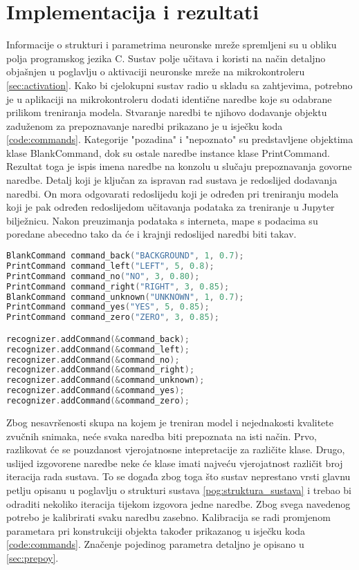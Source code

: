 \chapter{Implementacija i rezultati}
\label{pog:implement}

Informacije o strukturi i parametrima neuronske mreže spremljeni su u obliku polja
programskog jezika C. Sustav polje učitava i koristi na način detaljno objašnjen 
u poglavlju o aktivaciji neuronske mreže na mikrokontroleru \ref{sec:activation}.
Kako bi cjelokupni sustav radio u skladu sa zahtjevima, potrebno je u aplikaciji
na mikrokontroleru dodati identične naredbe koje su odabrane prilikom treniranja
modela. Stvaranje naredbi te njihovo dodavanje objektu zaduženom za prepoznavanje
naredbi prikazano je u isječku koda \ref{code:commands}. Kategorije "pozadina" i
"nepoznato" su predstavljene objektima klase BlankCommand, dok su ostale naredbe 
instance klase PrintCommand. Rezultat toga je ispis imena naredbe na konzolu u slučaju
prepoznavanja govorne naredbe. Detalj koji je ključan za ispravan rad sustava je redoslijed
dodavanja naredbi. On mora odgovarati redoslijedu koji je određen pri treniranju modela koji
je pak određen redoslijedom učitavanja podataka za treniranje u Jupyter bilježnicu. Nakon
preuzimanja podataka s interneta, mape s podacima su poredane abecedno tako da 
će i krajnji redoslijed naredbi biti takav.

\begin{lstlisting}[language=C++, caption=Stvaranje naredbi, label=code:commands]
BlankCommand command_back("BACKGROUND", 1, 0.7);
PrintCommand command_left("LEFT", 5, 0.8);
PrintCommand command_no("NO", 3, 0.80);
PrintCommand command_right("RIGHT", 3, 0.85);
BlankCommand command_unknown("UNKNOWN", 1, 0.7);
PrintCommand command_yes("YES", 5, 0.85);
PrintCommand command_zero("ZERO", 3, 0.85);

recognizer.addCommand(&command_back);
recognizer.addCommand(&command_left);
recognizer.addCommand(&command_no);
recognizer.addCommand(&command_right);
recognizer.addCommand(&command_unknown);
recognizer.addCommand(&command_yes);
recognizer.addCommand(&command_zero);
\end{lstlisting}

Zbog nesavršenosti skupa na kojem je treniran model i nejednakosti kvalitete
zvučnih snimaka, neće svaka naredba biti prepoznata na isti način. Prvo, razlikovat će
se pouzdanost vjerojatnosne intepretacije za različite klase. Drugo, uslijed izgovorene
naredbe neke će klase imati najveću vjerojatnost različit broj iteracija rada sustava.
To se događa zbog toga što sustav neprestano vrsti glavnu petlju opisanu u poglavlju
o strukturi sustava \ref{pog:struktura_sustava} i trebao bi odraditi nekoliko iteracija tijekom izgovora
jedne naredbe. Zbog svega navedenog potrebo je kalibrirati svaku naredbu zasebno.
Kalibracija se radi promjenom parametara pri konstrukciji objekta također prikazanog 
u isječku koda \ref{code:commands}. Značenje pojedinog parametra detaljno je opisano u 
\ref{sec:prepoy}. 

